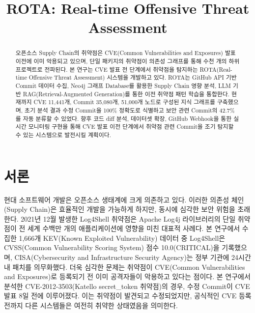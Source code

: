 ﻿\documentclass[conference]{IEEEtran}
\begin{document}
\sloppy
\setlength{\parskip}{0.3em}
\setlength{\parindent}{1em}

\renewcommand{\thesubsection}{\arabic{subsection}}

\title{ROTA: Real-time Offensive Threat Assessment}

\author{
}

\maketitle

\pagestyle{plain}
\thispagestyle{plain}

\begin{abstract}
오픈소스 Supply Chain의 취약점은 CVE(Common Vulnerabilities and Exposures) 발표 이전에 이미 악용되고 있으며, 단일 패키지의 취약점이 의존성 그래프를 통해 수천 개의 하위 프로젝트로 전파된다. 본 연구는 CVE 발표 전 단계에서 취약점을 탐지하는 ROTA(Real-time Offensive Threat Assessment) 시스템을 개발하고 있다. ROTA는 GitHub API 기반 Commit 데이터 수집, Neo4j 그래프 Database를 활용한 Supply Chain 영향 분석, LLM 기반 RAG(Retrieval-Augmented Generation)를 통한 이전 취약점 패턴 학습을 통합한다. 현재까지 CVE 11,441개, Commit 35,080개, 51,000개 노드로 구성된 지식 그래프를 구축했으며, 초기 분석 결과 수정 Commit을 100\% 정확도로 식별하고 보안 관련 Commit의 42.7\%를 자동 분류할 수 있었다. 향후 코드 diff 분석, 데이터셋 확장, GitHub Webhook을 통한 실시간 모니터링 구현을 통해 CVE 발표 이전 단계에서 취약점 관련 Commit을 조기 탐지할 수 있는 시스템으로 발전시킬 계획이다.
\end{abstract}

\section{서론}

\indent 현대 소프트웨어 개발은 오픈소스 생태계에 크게 의존하고 있다. 이러한 의존성 체인(Supply Chain)은 효율적인 개발을 가능하게 하지만, 동시에 심각한 보안 위험을 초래한다. 2021년 12월 발생한 Log4Shell 취약점은 Apache Log4j 라이브러리의 단일 취약점이 전 세계 수백만 개의 애플리케이션에 영향을 미친 대표적 사례다. 본 연구에서 수집한 1,666개 KEV(Known Exploited Vulnerability) 데이터 중 Log4Shell은 CVSS(Common Vulnerability Scoring System) 점수 10.0(CRITICAL)을 기록했으며, CISA(Cybersecurity and Infrastructure Security Agency)는 정부 기관에 24시간 내 패치를 의무화했다. 더욱 심각한 문제는 취약점이 CVE(Common Vulnerabilities and Exposures)로 등록되기 전 이미 공격자들이 악용하고 있다는 점이다. 본 연구에서 분석한 CVE-2012-3503(Katello secret\_token 취약점)의 경우, 수정 Commit이 CVE 발표 8일 전에 이루어졌다. 이는 취약점이 발견되고 수정되었지만, 공식적인 CVE 등록 전까지 다른 시스템들은 여전히 취약한 상태였음을 의미한다.
\end{document}
